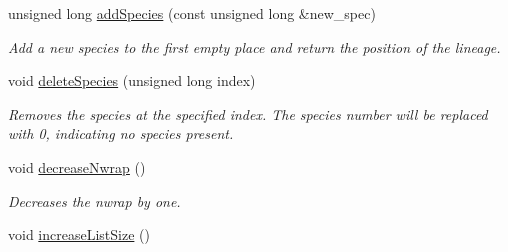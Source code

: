 \begin{DoxyCompactItemize}
unsigned long \hyperlink{class_species_list_a037e254fa1c99ef08d2e3875720f8d8f}{add\+Species} (const unsigned long \&new\+\_\+spec)
\begin{DoxyCompactList}\small\item\em Add a new species to the first empty place and return the position of the lineage. \end{DoxyCompactList}\item 
void \hyperlink{class_species_list_af7464b3a3ea20220634ab38476a195e4}{delete\+Species} (unsigned long index)
\begin{DoxyCompactList}\small\item\em Removes the species at the specified index. The species number will be replaced with 0, indicating no species present. \end{DoxyCompactList}\item 
void \hyperlink{class_species_list_a15420717ab0ba00bba0ff55f971ee3d2}{decrease\+Nwrap} ()
\begin{DoxyCompactList}\small\item\em Decreases the nwrap by one. \end{DoxyCompactList}\item 
void \hyperlink{class_species_list_ac15ecbcddcce068f75162dac03eafcfc}{increase\+List\+Size} ()\hypertarget{class_species_list_ac15ecbcddcce068f75162dac03eafcfc}{}\label{class_species_list_ac15ecbcddcce068f75162dac03eafcfc}


\end{DoxyCompactItemize}
